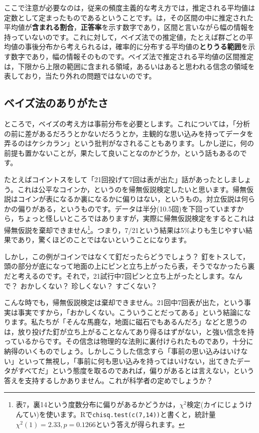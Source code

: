 \documentclass{ltjbook}
\begin{document}
ここで注意が必要なのは，従来の頻度主義的な考え方では，推定される平均値は定数として定まったものであるということです。は，その区間の中に推定された平均値が\textbf{含まれる割合}，\textbf{正答率}を示す数字であり，区間と言いながら幅の情報を持っていないのです。これに対して，ベイズ法での推定値，たとえば群ごとの平均値の事後分布から考えられるは，確率的に分布する平均値の\textbf{とりうる範囲}を示す数字であり，幅の情報そのものです。ベイズ法で推定される平均値の区間推定は，下限から上限の範囲に含まれる領域，あるいはあると思われる信念の領域を表しており，当たり外れの問題ではないのです。

\subsection{ベイズ法のありがたさ}
ところで，ベイズの考え方は事前分布を必要とします。これについては，「分析の前に差があるだろうとかないだろうとか，主観的な思い込みを持ってデータを弄るのはケシカラン」という批判がなされることもあります。しかし逆に，何の前提も置かないことが，果たして良いことなのかどうか，という話もあるのです\parencite{Maeda2017}。

たとえばコイントスをして「21回投げて7回は表が出た」話があったとしましょう。これは公平なコインか，というのを帰無仮説検定したいと思います。帰無仮説はコインが表になるか裏になるかに偏りはない，というもの。対立仮説は何らかの偏りがある，というものです。データは半分(10.5回)を下回っていますから，ちょっと怪しいところではありますが，実際に帰無仮説検定をするとこれは帰無仮説を棄却できません\footnote{表7，裏14という度数分布に偏りがあるかどうかは，$\chi^2$検定(カイにじょうけんてい)を使います。Rで\texttt{chisq.test(c(7,14))}と書くと，統計量$\chi^2(1)=2.33,p=0.1266$という答えが得られます。}。つまり，7/21という結果は5\%よりも生じやすい結果であり，驚くほどのことではないということになります。

しかし，この例がコインではなくて釘だったらどうでしょう？ 釘をトスして，頭の部分が底になって地面の上にピンと立ち上がったら表，そうでなかったら裏だと考えるのです。それで，21試行中7回ピンと立ち上がったとします。なんで？ おかしくない？ 珍しくない？ すごくない？

こんな時でも，帰無仮説検定は棄却できません。21回中7回表が出た，という事実は事実ですから，「おかしくない。こういうことだってある」という結論になります。私たちが「そんな馬鹿な，地面に磁石でもあるんだろ」などと思うのは，放り投げた釘が立ち上がることなんてあり得るはずがない，と強い信念を持っているからです。その信念は物理的な法則に裏付けられたものであり，十分に納得のいくものでしょう。しかしこうした信念すら「事前の思い込みはいけない」といって無視し，「事前に何も思い込みを持ってはいけない，出てきたデータがすべてだ」という態度を取るのであれば，偏りがあるとは言えない，という答えを支持するしかありません。これが科学者の定めでしょうか？
\end{document}
